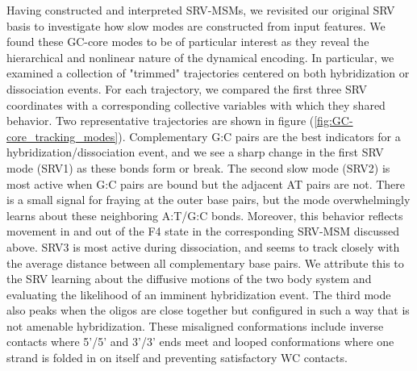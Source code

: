 \documentclass[journal=jpcbfk,manuscript=article]{achemso}
\begin{document}
Having constructed and interpreted SRV-MSMs, we revisited our original SRV basis to investigate how slow modes are constructed from input features. We found these GC-core modes to be of particular interest as they reveal the hierarchical and nonlinear nature of the dynamical encoding. In particular, we examined a collection of "trimmed" trajectories centered on both hybridization or dissociation events. For each trajectory, we compared the first three SRV coordinates with a corresponding collective variables with which they shared behavior. Two representative trajectories are shown in figure (\ref{fig:GC-core_tracking_modes}). Complementary G:C pairs are the best indicators for a hybridization/dissociation event, and we see a sharp change in the first SRV mode (SRV1) as these bonds form or break. The second slow mode (SRV2) is most active when G:C pairs are bound but the adjacent AT pairs are not. There is a small signal for fraying at the outer base pairs, but the mode overwhelmingly learns about these neighboring A:T/G:C bonds. Moreover, this behavior reflects movement in and out of the F4 state in the corresponding SRV-MSM discussed above. SRV3 is most active during dissociation, and seems to track closely with the average distance between all complementary base pairs. We attribute this to the SRV learning about the diffusive motions of the two body system and evaluating the likelihood of an imminent hybridization event. The third mode also peaks when the oligos are close together but configured in such a way that is not amenable hybridization. These misaligned conformations include inverse contacts where 5'/5' and 3'/3' ends meet and looped conformations where one strand is folded in on itself and preventing satisfactory WC contacts. 
\end{document}
